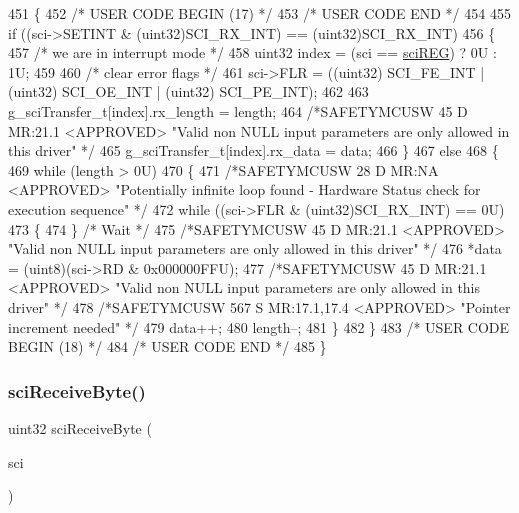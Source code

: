 \begin{DoxyCode}
451 \{
452 \textcolor{comment}{/* USER CODE BEGIN (17) */}
453 \textcolor{comment}{/* USER CODE END */}
454 
455     \textcolor{keywordflow}{if} ((sci->SETINT & (uint32)SCI\_RX\_INT) == (uint32)SCI\_RX\_INT)
456     \{
457         \textcolor{comment}{/* we are in interrupt mode */}
458         uint32 index = (sci == \mbox{\hyperlink{reg__sci_8h_acdc43faa5b34a7b497da4941e225e3ad}{sciREG}}) ? 0U : 1U;
459         
460         \textcolor{comment}{/* clear error flags */}
461         sci->FLR = ((uint32) SCI\_FE\_INT | (uint32) SCI\_OE\_INT | (uint32) SCI\_PE\_INT);
462 
463         g\_sciTransfer\_t[index].rx\_length = length;
464         \textcolor{comment}{/*SAFETYMCUSW 45 D MR:21.1 <APPROVED> "Valid non NULL input parameters are only allowed in this
       driver" */}
465         g\_sciTransfer\_t[index].rx\_data   = data;
466     \}
467     \textcolor{keywordflow}{else}
468     \{   
469         \textcolor{keywordflow}{while} (length > 0U)
470         \{
471             \textcolor{comment}{/*SAFETYMCUSW 28 D MR:NA <APPROVED> "Potentially infinite loop found - Hardware Status check
       for execution sequence" */}
472             \textcolor{keywordflow}{while} ((sci->FLR & (uint32)SCI\_RX\_INT) == 0U) 
473             \{ 
474             \} \textcolor{comment}{/* Wait */}
475             \textcolor{comment}{/*SAFETYMCUSW 45 D MR:21.1 <APPROVED> "Valid non NULL input parameters are only allowed in this
       driver" */}
476             *data = (uint8)(sci->RD & 0x000000FFU);
477             \textcolor{comment}{/*SAFETYMCUSW 45 D MR:21.1 <APPROVED> "Valid non NULL input parameters are only allowed in this
       driver" */}
478             \textcolor{comment}{/*SAFETYMCUSW 567 S MR:17.1,17.4 <APPROVED> "Pointer increment needed" */}
479             data++;
480             length--;
481         \}
482     \}
483 \textcolor{comment}{/* USER CODE BEGIN (18) */}
484 \textcolor{comment}{/* USER CODE END */}
485 \}
\end{DoxyCode}
\mbox{\label{group__SCI_gaec2932431dfdcdef7c3aba3da9cf4fe7}} 
\subsubsection{\texorpdfstring{sci\+Receive\+Byte()}{sciReceiveByte()}}
{\footnotesize\ttfamily uint32 sci\+Receive\+Byte (\begin{DoxyParamCaption}\item[{\mbox{\hyperlink{reg__sci_8h_ad5e2af74efb062728408d4ac1b7735db}{sci\+B\+A\+S\+E\+\_\+t}} $\ast$}]{sci }\end{DoxyParamCaption})}



